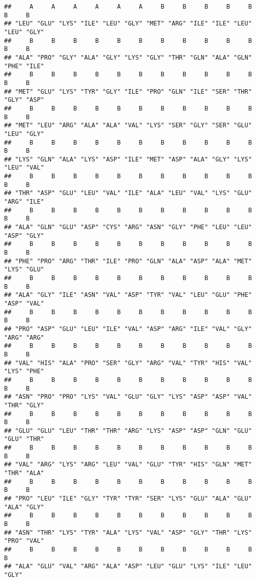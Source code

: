 \documentclass[
]{article}
\begin{document}
\begin{verbatim}
##     A     A     A     A     A     A     B     B     B     B     B     B     B 
## "LEU" "GLU" "LYS" "ILE" "LEU" "GLY" "MET" "ARG" "ILE" "ILE" "LEU" "LEU" "GLY" 
##     B     B     B     B     B     B     B     B     B     B     B     B     B 
## "ALA" "PRO" "GLY" "ALA" "GLY" "LYS" "GLY" "THR" "GLN" "ALA" "GLN" "PHE" "ILE" 
##     B     B     B     B     B     B     B     B     B     B     B     B     B 
## "MET" "GLU" "LYS" "TYR" "GLY" "ILE" "PRO" "GLN" "ILE" "SER" "THR" "GLY" "ASP" 
##     B     B     B     B     B     B     B     B     B     B     B     B     B 
## "MET" "LEU" "ARG" "ALA" "ALA" "VAL" "LYS" "SER" "GLY" "SER" "GLU" "LEU" "GLY" 
##     B     B     B     B     B     B     B     B     B     B     B     B     B 
## "LYS" "GLN" "ALA" "LYS" "ASP" "ILE" "MET" "ASP" "ALA" "GLY" "LYS" "LEU" "VAL" 
##     B     B     B     B     B     B     B     B     B     B     B     B     B 
## "THR" "ASP" "GLU" "LEU" "VAL" "ILE" "ALA" "LEU" "VAL" "LYS" "GLU" "ARG" "ILE" 
##     B     B     B     B     B     B     B     B     B     B     B     B     B 
## "ALA" "GLN" "GLU" "ASP" "CYS" "ARG" "ASN" "GLY" "PHE" "LEU" "LEU" "ASP" "GLY" 
##     B     B     B     B     B     B     B     B     B     B     B     B     B 
## "PHE" "PRO" "ARG" "THR" "ILE" "PRO" "GLN" "ALA" "ASP" "ALA" "MET" "LYS" "GLU" 
##     B     B     B     B     B     B     B     B     B     B     B     B     B 
## "ALA" "GLY" "ILE" "ASN" "VAL" "ASP" "TYR" "VAL" "LEU" "GLU" "PHE" "ASP" "VAL" 
##     B     B     B     B     B     B     B     B     B     B     B     B     B 
## "PRO" "ASP" "GLU" "LEU" "ILE" "VAL" "ASP" "ARG" "ILE" "VAL" "GLY" "ARG" "ARG" 
##     B     B     B     B     B     B     B     B     B     B     B     B     B 
## "VAL" "HIS" "ALA" "PRO" "SER" "GLY" "ARG" "VAL" "TYR" "HIS" "VAL" "LYS" "PHE" 
##     B     B     B     B     B     B     B     B     B     B     B     B     B 
## "ASN" "PRO" "PRO" "LYS" "VAL" "GLU" "GLY" "LYS" "ASP" "ASP" "VAL" "THR" "GLY" 
##     B     B     B     B     B     B     B     B     B     B     B     B     B 
## "GLU" "GLU" "LEU" "THR" "THR" "ARG" "LYS" "ASP" "ASP" "GLN" "GLU" "GLU" "THR" 
##     B     B     B     B     B     B     B     B     B     B     B     B     B 
## "VAL" "ARG" "LYS" "ARG" "LEU" "VAL" "GLU" "TYR" "HIS" "GLN" "MET" "THR" "ALA" 
##     B     B     B     B     B     B     B     B     B     B     B     B     B 
## "PRO" "LEU" "ILE" "GLY" "TYR" "TYR" "SER" "LYS" "GLU" "ALA" "GLU" "ALA" "GLY" 
##     B     B     B     B     B     B     B     B     B     B     B     B     B 
## "ASN" "THR" "LYS" "TYR" "ALA" "LYS" "VAL" "ASP" "GLY" "THR" "LYS" "PRO" "VAL" 
##     B     B     B     B     B     B     B     B     B     B     B     B 
## "ALA" "GLU" "VAL" "ARG" "ALA" "ASP" "LEU" "GLU" "LYS" "ILE" "LEU" "GLY"
\end{verbatim}
\end{document}
